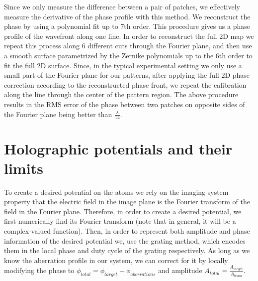 Since we only measure the difference between a pair of patches, we effectively measure the derivative of the phase profile with this method. We reconstruct the phase by using a polynomial fit up to $7\mathrm{th}$ order. This procedure gives us a phase profile of the wavefront along one line. In order to reconstruct the full $2\mathrm{D}$ map we repeat this process along 6 different cuts through the Fourier plane, and then use a smooth surface parametrized by the Zernike polynomials up to the $6\mathrm{th}$ order to fit the full $2\mathrm{D}$ surface. Since, in the typical experimental setting we only use a small part of the Fourier plane for our patterns, after applying the full $2\mathrm{D}$ phase correction according to the reconstructed phase front, we repeat the calibration along the line through the center of the pattern region. The above procedure results in the RMS error of the phase between two patches on opposite sides of the Fourier plane being better than $\frac{\lambda}{14}$.

\section{Holographic potentials and their limits}
To create a desired potential on the atoms we rely on the imaging system property that the electric field in the image plane is the Fourier transform of the field in the Fourier plane. Therefore, in order to create a desired potential, we first numerically find its Fourier transform (note that in general, it will be a complex-valued function). Then, in order to represent both amplitude and phase information of the desired potential we, use the grating method, which encodes them in the local phase and duty cycle of the grating respectively. As long as we know the aberration profile in our system, we can correct for it by locally modifying the phase to $\phi_{total} = \phi_{target} - \phi_{aberrations}$ and amplitude $A_{total} = \frac{A_{target}}{A_{beam}}$.

